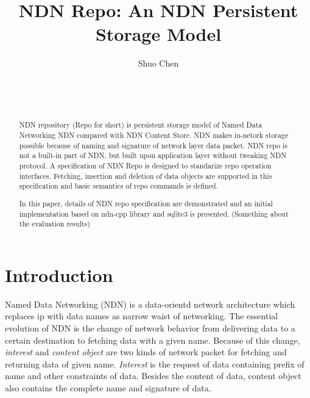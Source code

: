 \documentclass{acm_proc_article-sp}
\begin{document}
\title{NDN Repo: An NDN Persistent Storage Model}


\author{
\alignauthor
Shuo Chen\\
	\\
	\\
	\\
}
\maketitle

\begin{abstract}
NDN repository (Repo for short) is persistent storage model of Named Data Networking NDN compared with NDN Content Store. NDN makes in-netork storage possible because of naming and signature of network layer data packet. NDN repo is not a built-in part of NDN, but built upon application layer without tweaking NDN protocol. A specification of NDN Repo is designed to standarize repo operation interfaces. Fetching, insertion and deletion of data objects are supported in this specification and basic semantics of repo commands is defined.

In this paper, details of NDN repo specification are demonstrated and an initial implementation based on ndn-cpp library and sqlite3 is presented. (Something about the evaluation results)
\end{abstract}

\section{Introduction}
Named Data Networking (NDN) \cite{zhang2010named} is a data-orientd network architecture which replaces ip with data names as narrow waist of networking. The essential evolution of NDN is the change of network behavior from delivering data to a certain destination to fetching data with a given name. \cite{zhang2010named} Because of this change, \emph{interest} and \emph{content object} are two kinds of network packet for fetching and returning data of given name. \emph{Interest} is the request of data containing prefix of name and other constraints of data. Besides the content of data, content object also contains the complete name and signature of data.
\end{document}
